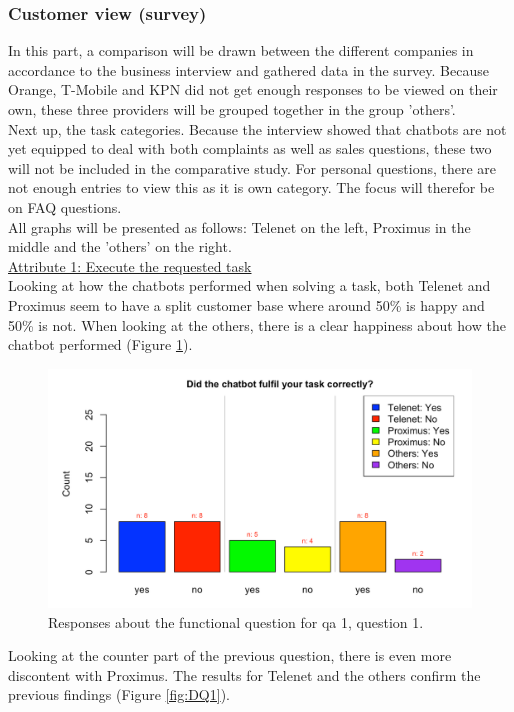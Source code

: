 \subsubsection{Customer view (survey)}
In this part, a comparison will be drawn between the different companies in accordance to the business interview and gathered data in the survey. Because Orange, T-Mobile and KPN did not get enough responses to be viewed on their own, these three providers will be grouped together in the group 'others'.\\
\break
Next up, the task categories. Because the interview showed that chatbots are not yet equipped to deal with both complaints as well as sales questions, these two will not be included in the comparative study. For personal questions, there are not enough entries to view this as it is own category. The focus will therefor be on FAQ questions.\\
\break
All graphs will be presented as follows: Telenet on the left, Proximus in the middle and the 'others' on the right.\\
\break
\ul{Attribute 1: Execute the requested task}\\
\break
Looking at how the chatbots performed when solving a task, both Telenet and Proximus seem to have a split customer base where around 50\% is happy and 50\% is not. When looking at the others, there is a clear happiness about how the chatbot performed (Figure \ref{fig:Q1}).\\
\begin{figure}[!htb]
	\includegraphics[width=\linewidth, scale=0.5]{../LaTeX/Figures/Comparative/Q1.png}
	\caption{Responses about the functional question for \acrshort{qa} 1, question 1.}\label{fig:Q1}
\end{figure}
Looking at the counter part of the previous question, there is even more discontent with Proximus. The results for Telenet and the others confirm the previous findings (Figure \ref{fig:DQ1}).

